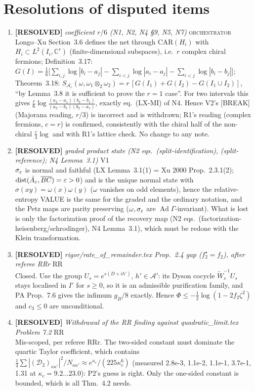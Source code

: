 \documentclass[11pt]{article}
\begin{document}
\section{Resolutions of disputed items}
\begin{enumerate}[leftmargin=1.6em,itemsep=6pt]
\item \textbf{[RESOLVED]} \emph{coefficient \(r/6\) (N1, N2, N4 \S9, N5, N7)} \hfill\textsc{orchestrator}\\ Longo--Xu Section~3.6 defines the net through \(\mathrm{CAR}(H_i)\) with \(H_i\subset L^2(I_i,\mathbb C^r)\) (finite-dimensional subspaces), i.e.\ \(r\) complex chiral fermions; Definition~3.17: \(G(I)=\frac16\bigl[\sum_{i,j}\log|b_i-a_j|-\sum_{i<j}\log|a_i-a_j|-\sum_{i<j}\log|b_i-b_j|\bigr]\); Theorem~3.18: \(S_{\mathcal A_r}(\omega,\omega_1\otimes_2\omega_2)=r\,[G(I_1)+G(I_2)-G(I_1\cup I_2)]\), ``by Lemma~3.8 it is sufficient to prove the \(r=1\) case''. For two intervals this gives \(\frac r6\log\frac{(a_2-a_1)(b_2-b_1)}{(a_2-b_1)(b_2-a_1)}\), exactly eq.\ (LX-MI) of N4. Hence V2's [BREAK] (Majorana reading, \(r/3\)) is incorrect and is withdrawn; R1's reading (complex fermions, \(c=r\)) is confirmed, consistently with the chiral half of the non-chiral \(\frac c3\log\) and with R1's lattice check. No change to any note.
\item \textbf{[RESOLVED]} \emph{graded product state (N2 eqs.\ (split-identification), (split-reference); N4 Lemma~3.1)} \hfill\textsc{V1}\\ \(\sigma_\varepsilon\) is normal and faithful (LX Lemma~3.1(1) = Xu 2000 Prop.~2.3.1(2); \(\mathrm{dist}(\bar A_\varepsilon,\overline{BC})=\varepsilon>0\)) and is the unique normal state with \(\sigma(xy)=\omega(x)\omega(y)\) (\(\omega\) vanishes on odd elements), hence the relative-entropy VALUE is the same for the graded and the ordinary notation, and the Petz maps are parity preserving (\(\omega,\sigma_\varepsilon\) are \(\operatorname{Ad}\Gamma\)-invariant). What is lost is only the factorization proof of the recovery map (N2 eqs.\ (factorization-heisenberg/schrodinger), N4 Lemma~3.1), which must be redone with the Klein transformation.
\item \textbf{[RESOLVED]} \emph{rigor/rate\_of\_remainder.tex Prop.~2.4 gap (\(f_2^\star=f_2\)), after referee RRr} \hfill\textsc{RR}\\ Closed. Use the group \(U_s=e^{s(D+ih')}\), \(h'\in\mathcal A'\): its Dyson cocycle \(\widetilde W_s^{-1}U_s\) stays localised in \(I'\) for \(s\ge0\), so it is an admissible purification family, and PA Prop.~7.6 gives the infimum \(g_B/8\) exactly. Hence \(\Phi\le-\tfrac12\log(1-2f_2\zeta^2)\) and \(c_3\le0\) are unconditional.
\item \textbf{[RESOLVED]} \emph{Withdrawal of the RR finding against quadratic\_limit.tex Problem 7.2} \hfill\textsc{RR}\\ Mis-scoped, per referee RRr. The two-sided constant must dominate the quartic Taylor coefficient, which contains \(\tfrac14\sum|(\mathcal D_2)_{\kappa\kappa'}|^2/N_{\kappa\kappa'}\approx e^{\kappa_c}/(225\kappa_c^6)\) (measured 2.8e-3, 1.1e-2, 1.1e-1, 3.7e-1, 1.31 at \(\kappa_c=9.2\dots23.0\)): P2's guess is right. Only the one-sided constant is bounded, which is all Thm.~4.2 needs.
\end{enumerate}
\end{document}
